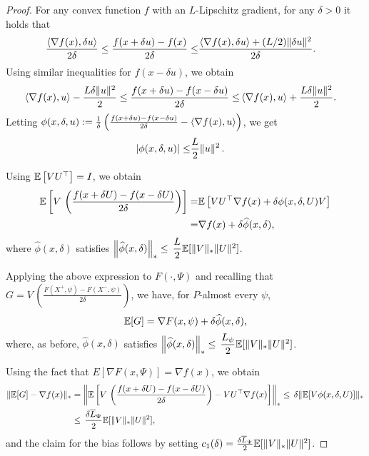 \begin{proof}
For any convex function $f$ with an $L$-Lipschitz gradient, for any $\delta>0$ it holds that
\begin{align*}
\frac{\left\langle\nabla f(x), \delta u\right\rangle}{2\delta} \le \frac{f(x + \delta u) -  f(x)}{2\delta} \le& \frac{\left\langle\nabla f(x), \delta u\right\rangle + (L / 2) \|\delta u\|^2}{2\delta}.
\end{align*}
Using similar inequalities for $f(x-\delta u)$, we obtain
\begin{align*}
\left\langle\nabla f(x), u\right\rangle - \frac{L \delta \| u\|^2}{2} \le \frac{f(x + \delta u) -  f(x-\delta u)}{2\delta} \le& \left\langle\nabla f(x), u\right\rangle + \frac{L \delta \| u\|^2}{2}.
\end{align*}
Letting
$\phi(x,\delta,u):=\frac1{\delta}\left(\frac{f(x + \delta u) -  f(x-\delta u)}{2\delta} - \left\langle\nabla f(x),  u\right\rangle\right)$, we get
\begin{align*}
\left|\phi(x,\delta,u) \right| \le&  \dfrac{L}{2} \|u\|^2\,.
\end{align*}

Using $\mathbb{E}\left[V U^\top\right]=I$, we obtain
\begin{align*}
\mathbb{E}\left[V\,  \left(\frac{f(x+\delta U)  -f(x-\delta U)}{2\delta}\right)\right]=&
\mathbb{E}\left[ V U^\top\nabla f(x) +  \delta\phi(x,\delta,U) V \right]\\
= &  \nabla f(x) + \delta \widehat\phi(x,\delta),
\end{align*}
where $\widehat\phi(x,\delta)$ satisfies $\left\|\widehat\phi(x,\delta)\right\|_*  \le \, \dfrac{L}{2}\mathbb{E}[ \|V\|_* \|U\|^2]$.

Applying the above expression to $F(\cdot, \Psi)$ and recalling that $G=V\,  \left(\tfrac{F(X^+,\psi)  -F(X^-,\psi)}{2\delta}\right)$, we have, for $P$-almost every $\psi$, 
$$\mathbb{E}[G] = \nabla F(x,\psi) + \delta \widehat\phi(x,\delta),$$
where, as before, $\widehat\phi(x,\delta)$ satisfies $\left\|\widehat\phi(x,\delta)\right\|_*  \le \, \dfrac{L_{\psi}}{2}\mathbb{E}[ \|V\|_* \|U\|^2]$.

Using the fact that $E[\nabla F(x,\Psi)] = \nabla f(x)$, we obtain
\begin{align*}
 \|\mathbb{E}[G] - \nabla f(x)\|_*
 &= \left\|\mathbb{E}\left[V\,  \left(\frac{f(x+\delta U)  -f(x-\delta U)}{2\delta}\right)-V U^\top\nabla f(x) \right]\right\|_*
 \le \, \delta \|\mathbb{E}[ V \phi(x,\delta, U)]\|_*\\
 &\le \,\frac{\delta \overline{L}_{\Psi}}{2} \mathbb{E}[ \|V\|_* \|U\|^2],
\end{align*}
and the claim for the bias follows by setting $c_1(\delta)= \frac{\delta \overline{L}_{\Psi}}{2} \mathbb{E}[ \|V\|_* \|U\|^2]$.


\end{proof}
